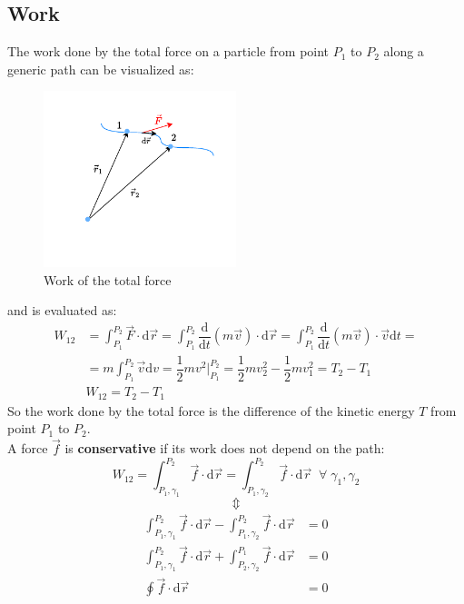 \subsection{Work}
The work done by the total force on a particle from point $P_1$ to $P_2$ along a generic path can be visualized as:
\begin{figure}[H]
    \centering
    \includegraphics[width=0.5\textwidth]{res/svg/work.drawio}
    \caption{Work of the total force}
    \label{fig:image4}
\end{figure}
and is evaluated as:
\begin{equation} \label{e:total_work}
  \begin{split}
    W_{12} &= \int_{P_1}^{P_2}\vec{F}\cdot\mathrm{d}\vec{r} = \int_{P_1}^{P_2}\dfrac{\mathrm{d}}{\mathrm{d}t}(m\vec{v})\cdot\mathrm{d}\vec{r} = \int_{P_1}^{P_2}\dfrac{\mathrm{d}}{\mathrm{d}t}(m\vec{v})\cdot\vec{v}\mathrm{d}t = \\[8pt]
    &= m\int_{P_1}^{P_2}\vec{v}\mathrm{d}v = \dfrac{1}{2}mv^2\bigg|_{P_1}^{P_2} = \dfrac{1}{2}mv_2^2 - \dfrac{1}{2}mv_1^2 = T_2 -T_1\\[8pt]
    &\boxed{W_{12} = T_2 -T_1}
  \end{split}
\end{equation}
So the work done by the total force is the difference of the kinetic energy $T$ from point $P_1$ to $P_2$.\\
A force $\vec{f}$ is \textbf{conservative} if its work does not depend on the path:
\begin{equation}
    W_{12} = \int_{P_1,\gamma_1}^{P_2}\vec{f}\cdot\mathrm{d}\vec{r} = \int_{P_1,\gamma_2}^{P_2}\vec{f}\cdot\mathrm{d}\vec{r}\;\;\forall\;\gamma_1, \gamma_2
\end{equation}
\[\Updownarrow \]
\begin{equation}
  \begin{split}
    \int_{P_1,\gamma_1}^{P_2}\vec{f}\cdot\mathrm{d}\vec{r} - \int_{P_1,\gamma_2}^{P_2}\vec{f}\cdot\mathrm{d}\vec{r} &= 0 \\[8pt]
    \int_{P_1,\gamma_1}^{P_2}\vec{f}\cdot\mathrm{d}\vec{r} + \int_{P_2,\gamma_2}^{P_1}\vec{f}\cdot\mathrm{d}\vec{r} &= 0 \\[8pt]
    \oint\vec{f}\cdot\mathrm{d}\vec{r} &= 0
  \end{split}
\end{equation}
